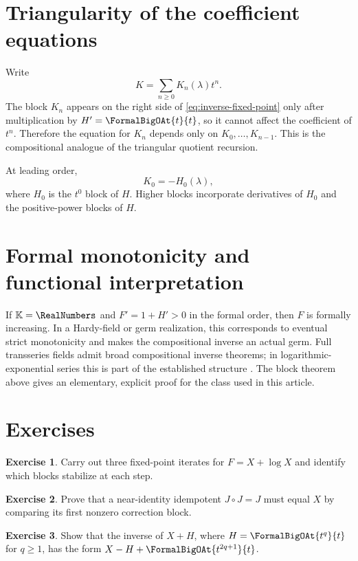 \documentclass[11pt,openany]{book}
\theoremstyle{definition}
\newtheorem{exercise}{Exercise}[chapter]
\theoremstyle{plain}
\theoremstyle{remark}
\newcommand{\K}{\mathbb{K}}
\begin{document}
\section{Triangularity of the coefficient equations}
Write
\[
 K=\sum_{n\ge0}K_n(\lambda)t^n.
\]
The block \(K_n\) appears on the right side of \cref{eq:inverse-fixed-point} only after multiplication by \(H'=\FormalBigOAt{t}{t}\), so it cannot affect the coefficient of \(t^n\). Therefore the equation for \(K_n\) depends only on \(K_0,\ldots,K_{n-1}\). This is the compositional analogue of the triangular quotient recursion.

At leading order,
\begin{equation}\label{eq:inverse-leading-correction}
 K_0=-H_0(\lambda),
\end{equation}
where \(H_0\) is the \(t^0\) block of \(H\). Higher blocks incorporate derivatives of \(H_0\) and the positive-power blocks of \(H\).

\section{Formal monotonicity and functional interpretation}
If \(\K=\RealNumbers\) and \(F'=1+H'>0\) in the formal order, then \(F\) is formally increasing. In a Hardy-field or germ realization, this corresponds to eventual strict monotonicity and makes the compositional inverse an actual germ. Full transseries fields admit broad compositional inverse theorems; in logarithmic-exponential series this is part of the established structure \cite{vdDMM-2001,adh-book}. The block theorem above gives an elementary, explicit proof for the class used in this article.

\section{Exercises}
\begin{exercise}
Carry out three fixed-point iterates for \(F=X+\log X\) and identify which blocks stabilize at each step.
\end{exercise}
\begin{exercise}
Prove that a near-identity idempotent \(J\circ J=J\) must equal \(X\) by comparing its first nonzero correction block.
\end{exercise}
\begin{exercise}
Show that the inverse of \(X+H\), where \(H=\FormalBigOAt{t^q}{t}\) for \(q\ge1\), has the form \(X-H+\FormalBigOAt{t^{2q+1}}{t}\).
\end{exercise}
\end{document}

